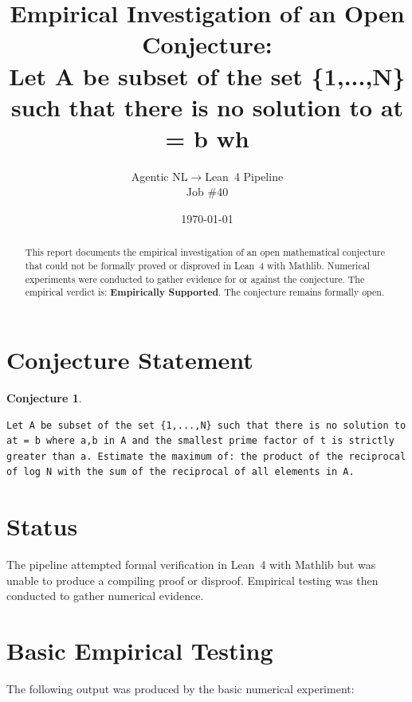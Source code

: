 \documentclass[11pt]{article}
\title{Empirical Investigation of an Open Conjecture:\\
Let A be subset of the set \{1,...,N\} such that there is no solution to at = b wh}
\author{Agentic NL$\to$Lean~4 Pipeline \\ \small Job \#40}
\date{\today}
\newtheorem{conjecture}{Conjecture}
\begin{document}
\maketitle

\begin{abstract}
This report documents the empirical investigation of an open mathematical conjecture
that could not be formally proved or disproved in Lean~4 with Mathlib.
Numerical experiments were conducted to gather evidence for or against the conjecture.
The empirical verdict is: \textbf{\textcolor{green!70!black}{Empirically Supported}}.
The conjecture remains formally open.
\end{abstract}

\section{Conjecture Statement}

\begin{conjecture}
\begin{lstlisting}
Let A be subset of the set {1,...,N} such that there is no solution to at = b where a,b in A and the smallest prime factor of t is strictly greater than a. Estimate the maximum of: the product of the reciprocal of log N with the sum of the reciprocal of all elements in A.
\end{lstlisting}
\end{conjecture}

\section{Status}

\begin{center}
\end{center}

The pipeline attempted formal verification in Lean~4 with Mathlib but was unable to
produce a compiling proof or disproof. Empirical testing was then conducted to gather
numerical evidence.

\section{Basic Empirical Testing}

The following output was produced by the basic numerical experiment:
\end{document}
